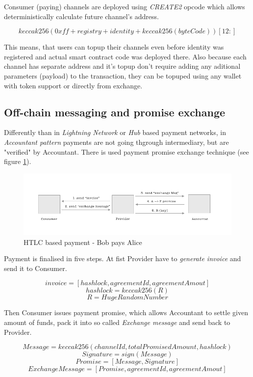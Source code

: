 \documentclass[a4paper,12pt]{article}
\begin{document}
Consumer (paying) channels are deployed using \textit{CREATE2} opcode \cite{create2} 
which allows deterministically calculate future channel's address.

\[ keccak256(0xff + registry + identity + keccak256(byteCode))[12:]\]

This means, that users can topup their channels even before identity was 
registered and actual smart contract code was deployed there. Also because each
channel has separate address and it's topup don't require adding any aditional 
parameters (payload) to the transaction, they can be topuped using any wallet 
with token support or directly from exchange.

\subsection{Off-chain messaging and promise exchange}

Differently than in \textit{Lightning Network} or \textit{Hub} based payment 
networks, in \textit{Accountant pattern} payments are not going thgrough 
intermediary, but are "verified" by Accountant. There is used payment promise 
exchange technique (see figure \ref{img:off-chain-interactions}).

\begin{figure}[H]
    \centering
    \includegraphics[scale=0.5]{../img/off-chain-interactions}
    \caption{HTLC based payment - Bob pays Alice}
    \label{img:off-chain-interactions}
\end{figure}

Payment is finalised in five steps. At fist Provider have to \textit{generate 
invoice} and send it to Consumer.

\[ invoice = [hashlock, agreementId, agreementAmout] \]
\[ hashlock = keccak256(R) \]
\[ R = HugeRandomNumber \]

Then Consumer issues payment promise, which allows Accountant to settle given 
amount of funds, pack it into so called \textit{Exchange message} and send back 
to Provider. 

\[ Message = keccak256(channelId, totalPromisedAmount, hashlock) \]
\[ Signature = sign(Message) \]
\[ Promise = [Message, Signature]\]
\[ ExchangeMessage = [Promise, agreementId, agreementAmout] \]
\end{document}
